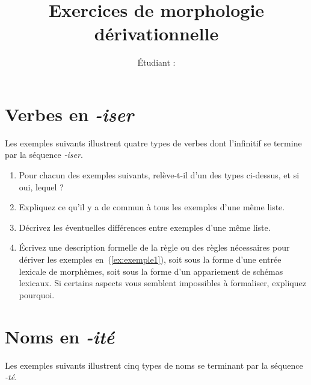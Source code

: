 

\title{Exercices de morphologie dérivationnelle}
\author{}
\date{Étudiant : \student}

\maketitle

\section{Verbes en \emph{-iser}}

Les exemples suivants illustrent quatre types de verbes dont l'infinitif  se termine par la séquence \emph{-iser}.

\begin{exe}
  \ex\begin{xlist}
    \ex \exunadj
    \ex \exunnoun
    \ex \label{ex:exemple1} \exunprefix
    \ex \exunsimplex
  \end{xlist}
\end{exe}

\begin{enumerate}
\item Pour chacun des exemples suivants, relève-t-il d'un des types ci-dessus, et si oui, lequel ?
  \begin{exe}
    \ex \exunaclasser
  \end{exe}
\item Expliquez ce qu'il y a de commun à tous les exemples d'une même liste.
\item Décrivez les éventuelles différences entre exemples d'une même liste.
\item Écrivez une description formelle de la règle ou des règles nécessaires pour dériver les exemples en~(\ref{ex:exemple1}), soit sous la forme d'une entrée lexicale de morphèmes, soit sous la forme d'un appariement de schémas lexicaux. Si certains aspects vous semblent impossibles à formaliser, expliquez pourquoi.
\end{enumerate}

\section{Noms en \emph{-ité}}

Les exemples suivants illustrent cinq types de noms se terminant par la séquence \emph{-té}.

\begin{exe}
  \ex
  \begin{xlist}
    \ex \exdeuxabsurdite
    \ex \label{ex:exemple2} \exdeuxadaptabilite
    \ex \exdeuxbiodiversite
    \ex \exdeuxbonte
    \ex \exdeuxparite
  \end{xlist}
\end{exe}

